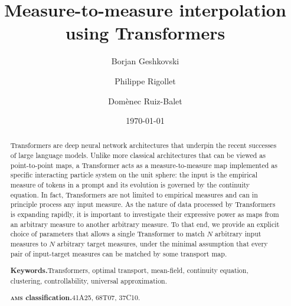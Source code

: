 \documentclass[a4paper,11pt]{article}
\title{ Measure-to-measure interpolation using Transformers }
\author{Borjan Geshkovski}
\affil{Inria \& Sorbonne Université}
\author{Philippe Rigollet}
\affil{MIT}
\author{Domènec Ruiz-Balet}
\affil{Université Paris Dauphine}
\date{ \today }
\theoremstyle{plain}
\numberwithin{equation}{section}
\newcommand{\nddrb}[1]{ {\text{{\bf drb:}} \color{magenta}{#1} } }
\begin{document}
%
%

\maketitle

%
%


\begin{abstract}

Transformers are deep neural network architectures that underpin the recent successes of large language models. Unlike more classical architectures that can be viewed as point-to-point maps, a Transformer acts as a measure-to-measure map implemented as specific interacting particle system on the unit sphere: the input is the empirical measure of tokens in a prompt and its evolution is governed by the continuity equation. In fact, Transformers are not limited to empirical measures and can in principle process any input measure.  As the nature of data processed by Transformers is expanding rapidly, it is important to investigate their expressive power  as maps from an arbitrary measure to another arbitrary measure. To that end, we provide an explicit choice of parameters that allows a single Transformer to match $N$ arbitrary input measures to $N$ arbitrary target measures, under the minimal assumption that every pair of input-target measures can be matched by some transport map.
			
\bigskip

\noindent \textbf{Keywords.}\quad Transformers, optimal transport, mean-field, continuity equation, clustering, controllability, universal approximation.

\medskip

\noindent \textbf{\textsc{ams} classification.}\quad \textsc{41A25, 68T07, 37C10}.
\end{abstract}
	
\thispagestyle{empty}

\setcounter{tocdepth}{2}

\tableofcontents



%
%


\end{document}
